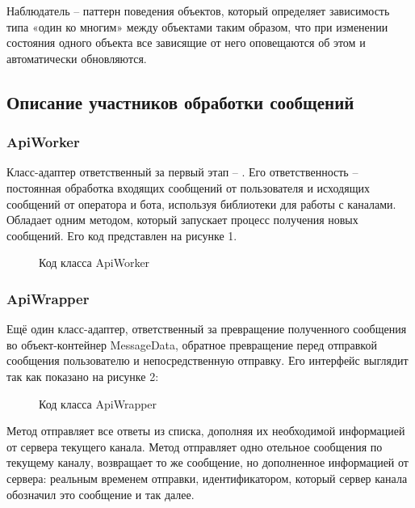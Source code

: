     Наблюдатель -- паттерн поведения объектов, который
    определяет зависимость типа «один ко многим» между объектами таким образом,
    что при изменении состояния одного объекта все зависящие от него оповещаются
    об этом и автоматически обновляются.\cite{design.patterns}
    
    \subsection{Описание участников обработки сообщений}
    \subsubsection{ApiWorker}
    Класс-адаптер ответственный за первый этап -- .
    Его ответственность -- постоянная обработка входящих сообщений от 
    пользователя и исходящих сообщений от оператора и бота, используя библиотеки
    для работы с каналами. Обладает одним методом, который запускает процесс 
    получения новых сообщений. Его код представлен на рисунке 1.
    \begin{figure}[H]
        \centering
        
        \caption{Код класса ApiWorker}
        \label{fig:api_worker}
    \end{figure}


    \subsubsection{ApiWrapper}
    Ещё один класс-адаптер, ответственный за превращение полученного сообщения 
    во объект-контейнер MessageData, обратное превращение перед отправкой
    сообщения пользователю и непосредственную отправку.
    Его интерфейс выглядит так как показано на рисунке 2:
    \begin{figure}[H]
        \centering
        
        \caption{Код класса ApiWrapper}
        \label{fig:api_wrapper}
    \end{figure}
    
    Метод  отправляет все ответы из списка, дополняя их
    необходимой информацией от сервера текущего канала. 
    Метод  отправляет одно отельное сообщения по текущему каналу,
    возвращает то же сообщение, но дополненное информацией от сервера: реальным временем
    отправки, идентификатором, который сервер канала обозначил это сообщение и так далее.



